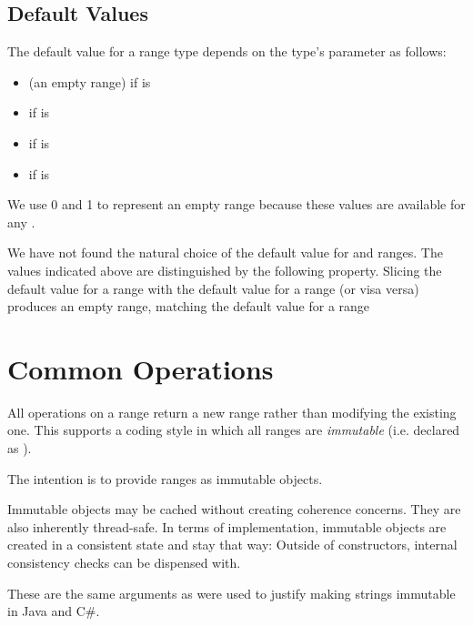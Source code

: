 \subsection{Default Values}
\label{Range_Default_Values}

The default value for a range type depends on the type's
 parameter as follows:

\begin{itemize}

\item {} (an empty range) if  is 

\item {} if  is 

\item {} if  is 

\item {} if  is 

\end{itemize}

\begin{rationale}
We use 0 and 1 to represent an empty range because these values
are available for any .

We have not found the natural choice of the default value for
 and  ranges.
The values indicated above are distinguished by the following property.
Slicing the default value for a  range with
the default value for a  range (or visa versa)
produces an empty range, matching the default value for a
 range
\end{rationale}


\section{Common Operations}
\label{Ranges_Common_Operations}

All operations on a range return a new range rather than modifying the existing one.  This
supports a coding style in which all ranges are \emph{immutable} (i.e. declared
as ).  

\begin{rationale}

The intention is to provide ranges as immutable objects.

Immutable objects may be cached without
creating coherence concerns.  They are also inherently thread-safe.  In terms of
implementation, immutable objects are created in a consistent state and stay that way:
Outside of constructors, internal consistency checks can be dispensed with.

These are the same arguments as were used to justify making strings immutable in Java and C\#.

\end{rationale}

